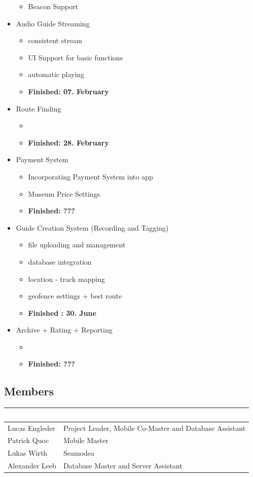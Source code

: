 \documentclass[12pt]{article}
\theoremstyle{definition}
\begin{document}
\begin{itemize}
\begin{itemize}
    \item Beacon Support
\end{itemize}
\item Audio Guide Streaming
\begin{itemize}
    \normalsize
    \item consistent stream 
    \item UI Support for basic functions
    \item automatic playing
    \item \textbf{Finished: 07. February}
\end{itemize}
\item Route Finding
\begin{itemize}
    \normalsize
    \item 
    \item \textbf{ Finished: 28. February }
\end{itemize}
\item Payment System
\begin{itemize}
    \normalsize
    \item Incorporating Payment System into app
    \item Museum Price Settings
    \item \textbf{Finished: ???}
\end{itemize}
\item Guide Creation System (Recording and Tagging)
\begin{itemize}
    \normalsize
    \item file uploading and management
    \item database integration
    \item location - track mapping
    \item geofence settings + best route
    \item \textbf{Finished : 30. June}
\end{itemize} 
\item Archive + Rating + Reporting
\begin{itemize}
    \normalsize
    \item 
    \item \textbf{Finished: ???}
\end{itemize}
\end{itemize}

\subsection{Members}
\begin{tabular}{|l|l|}
\hline
\cellcolor[gray]{0.5}\textcolor{white}{Name} & \cellcolor[gray]{0.5}\textcolor{white}{Role}\\ \hline
Lucas Engleder & Project Leader, Mobile Co-Master and Database Assistant\\ \hline
Patrick Quoc & Mobile Master\\ \hline
Lukas Wirth & Seamodea \\  \hline
Alexander Leeb & Database Master and Server Assistant \\ \hline
\end{tabular}
\end{document}
